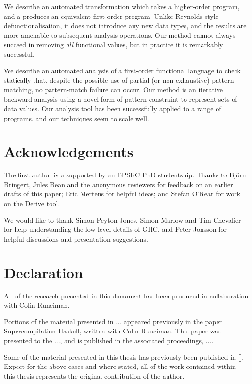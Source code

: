We describe an automated transformation which takes a higher-order program, and a produces an equivalent first-order program. Unlike Reynolds style defunctionalisation, it does not introduce any new data types, and the results are more amenable to subsequent analysis operations. Our method cannot always succeed in removing \textit{all} functional values, but in practice it is remarkably successful.

We describe an automated analysis of a first-order functional language to check statically that, despite the possible use of partial (or non-exhaustive) pattern matching, no pattern-match failure can occur.  Our method is an iterative backward analysis using a novel form of pattern-constraint to represent sets of data values. Our analysis tool has been successfully applied to a range of programs, and our techniques seem to scale well.


\tableofcontents
\listoffigures
\listoftables

\chapter*{Acknowledgements}


The first author is a supported by an EPSRC PhD studentship. Thanks to Bj\"{o}rn Bringert, Jules Bean and the anonymous reviewers for feedback on an earlier drafts of this paper; Eric Mertens for helpful ideas; and Stefan O'Rear for work on the Derive tool.

We would like to thank Simon Peyton Jones, Simon Marlow and Tim Chevalier for help understanding the low-level details of GHC, and Peter Jonsson for helpful discussions and presentation suggestions.


\chapter*{Declaration}

All of the research presented in this document has been produced in collaboration with Colin Runciman.

Portions of the material presented in ... appeared previously in the paper Supercompilation Haskell, written with Colin Runciman. This paper was presented to the ..., and is published in the associated proceedings, ....

Some of the material presented in this thesis has previously been published in []. Expect for the above cases and where stated, all of the work contained within this thesis represents the original contribution of the author.


